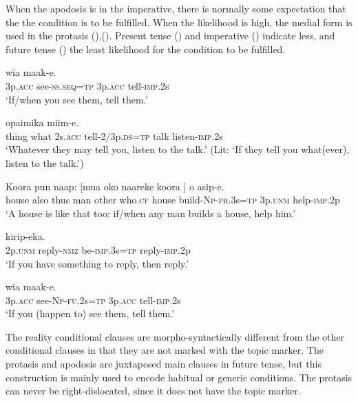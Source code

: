When the apodosis is in the imperative, there is normally some expectation that the the condition is to be fulfilled. When the likelihood is high, the medial form is used in the protasis (),(). Present tense () and imperative () indicate less, and future tense () the least likelihood for the condition to be fulfilled.

\ea%
\label{ex:x1650}
\gll [Wia  \textstyleEmphasizedVernacularWords{uruf-ap=na}]  wia  maak-e.\\
3p.\textsc{acc} see-\textsc{ss}.\textsc{seq}=\textsc{tp} 3p.\textsc{acc} tell-\textsc{imp}.2s\\
\glt`If/when you see them, tell them.'
\z


\ea%
\label{ex:x1649}
\gll [Maa  mauwa  nefa  \textstyleEmphasizedVernacularWords{maak-iwkin=na}]  opaimika  miim-e.\\
thing  what 2s.\textsc{acc} tell-2/3p.\textsc{ds}=\textsc{tp} talk  listen-\textsc{imp}.2s\\
\glt`Whatever they may tell you, listen to the talk.' (Lit: `If they tell you what(ever), listen to the talk.')
\z


\ea%
\label{ex:x1651}
\gll Koora  pun  naap:  [mua  oko  naareke  koora  ] o  asip-e.\\
house  also  thus  man  other  who.\textsc{cf} house  build-\textsc{Np}-\textsc{pr}.3s=\textsc{tp} 3p.\textsc{unm} help-\textsc{imp}.2p\\
\glt`A house is like that too: if/when any man builds a house, help him.'
\z


\ea%
\label{ex:x1656}
\gll [Ni  kirip-owa  \textstyleEmphasizedVernacularWords{ika-inok}=\textstyleEmphasizedVernacularWords{na}] kirip-eka.\\
2p.\textsc{unm} reply-\textsc{nmz} be-\textsc{imp}.3s=\textsc{tp} reply-\textsc{imp}.2p\\
\glt`If you have something to reply, then reply.'
\z


\ea%
\label{ex:x1657}
\gll [Wia  \textstyleEmphasizedVernacularWords{uruf-i-nan=na}] wia  maak-e.\\
3p.\textsc{acc} see-\textsc{Np}-\textsc{fu}.2s=\textsc{tp} 3p.\textsc{acc} tell-\textsc{imp}.2s\\
\glt`If you (happen to) see them, tell them.'
\z


The reality conditional clauses are morpho-syntactically different from the other conditional clauses in that they are not marked with the topic marker. The protasis and apodosis are juxtaposed main clauses in future tense, but this construction is mainly used to encode habitual or generic conditions. The protasis can never be right-dislocated, since it does not have the topic marker. 

